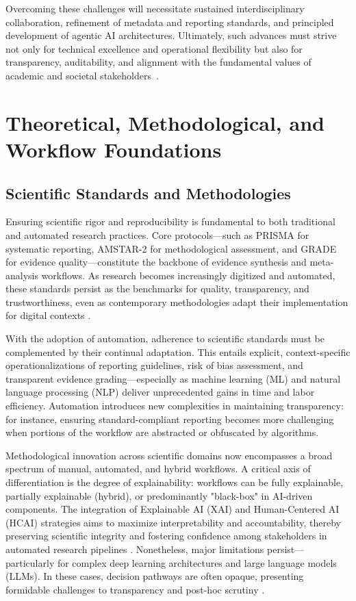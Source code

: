 \documentclass[sigconf]{acmart}
\begin{document}
Overcoming these challenges will necessitate sustained interdisciplinary collaboration, refinement of metadata and reporting standards, and principled development of agentic AI architectures. Ultimately, such advances must strive not only for technical excellence and operational flexibility but also for transparency, auditability, and alignment with the fundamental values of academic and societal stakeholders~\cite{ref101,ref102,ref103,ref104,ref105,ref106,ref111}.

\section{Theoretical, Methodological, and Workflow Foundations}

\subsection{Scientific Standards and Methodologies}

Ensuring scientific rigor and reproducibility is fundamental to both traditional and automated research practices. Core protocols—such as PRISMA for systematic reporting, AMSTAR-2 for methodological assessment, and GRADE for evidence quality—constitute the backbone of evidence synthesis and meta-analysis workflows. As research becomes increasingly digitized and automated, these standards persist as the benchmarks for quality, transparency, and trustworthiness, even as contemporary methodologies adapt their implementation for digital contexts \cite{ref1,ref2,ref5,ref9,ref10,ref28,ref29,ref30,ref31,ref37,ref38,ref43,ref51,ref61,ref62,ref63,ref78,ref80}.

With the adoption of automation, adherence to scientific standards must be complemented by their continual adaptation. This entails explicit, context-specific operationalizations of reporting guidelines, risk of bias assessment, and transparent evidence grading—especially as machine learning (ML) and natural language processing (NLP) deliver unprecedented gains in time and labor efficiency. Automation introduces new complexities in maintaining transparency: for instance, ensuring standard-compliant reporting becomes more challenging when portions of the workflow are abstracted or obfuscated by algorithms.

Methodological innovation across scientific domains now encompasses a broad spectrum of manual, automated, and hybrid workflows. A critical axis of differentiation is the degree of explainability: workflows can be fully explainable, partially explainable (hybrid), or predominantly "black-box" in AI-driven components. The integration of Explainable AI (XAI) and Human-Centered AI (HCAI) strategies aims to maximize interpretability and accountability, thereby preserving scientific integrity and fostering confidence among stakeholders in automated research pipelines \cite{ref51,ref64,ref80,ref81}. Nonetheless, major limitations persist—particularly for complex deep learning architectures and large language models (LLMs). In these cases, decision pathways are often opaque, presenting formidable challenges to transparency and post-hoc scrutiny \cite{ref76,ref78,ref80,ref91}.
\end{document}
